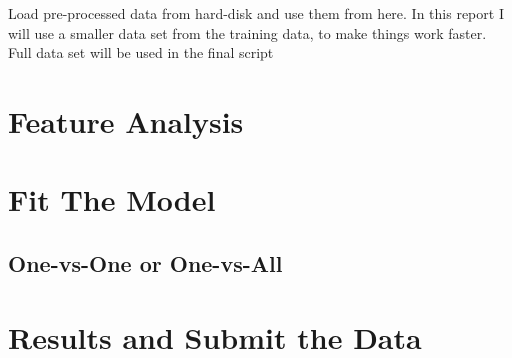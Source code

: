 \documentclass[]{article}
\newenvironment{Shaded}{\begin{snugshade}}{\end{snugshade}}
\newcommand{\CommentTok}[1]{\textcolor[rgb]{0.56,0.35,0.01}{\textit{#1}}}
\newcommand{\DataTypeTok}[1]{\textcolor[rgb]{0.13,0.29,0.53}{#1}}
\newcommand{\DecValTok}[1]{\textcolor[rgb]{0.00,0.00,0.81}{#1}}
\newcommand{\KeywordTok}[1]{\textcolor[rgb]{0.13,0.29,0.53}{\textbf{#1}}}
\newcommand{\NormalTok}[1]{#1}
\newcommand{\OperatorTok}[1]{\textcolor[rgb]{0.81,0.36,0.00}{\textbf{#1}}}
\newcommand{\StringTok}[1]{\textcolor[rgb]{0.31,0.60,0.02}{#1}}
\begin{document}
Load pre-processed data from hard-disk and use them from here. In this
report I will use a smaller data set from the training data, to make
things work faster. Full data set will be used in the final script

\begin{Shaded}
\end{Shaded}

\hypertarget{feature-analysis}{%
\section{Feature Analysis}\label{feature-analysis}}

\hypertarget{fit-the-model}{%
\section{Fit The Model}\label{fit-the-model}}

\hypertarget{one-vs-one-or-one-vs-all}{%
\subsection{One-vs-One or One-vs-All}\label{one-vs-one-or-one-vs-all}}

\hypertarget{results-and-submit-the-data}{%
\section{Results and Submit the
Data}\label{results-and-submit-the-data}}
\end{document}
